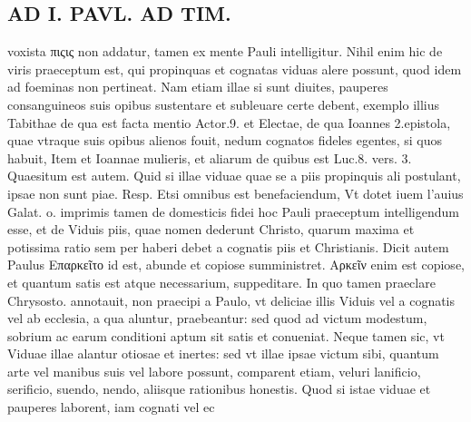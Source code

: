 \documentclass{article}
\begin{document}
\begin{pages}
\section*{AD I. PAVL. AD TIM. }
\marginpar{[ p.302 ]}\pstart voxista πιςις non addatur, tamen ex mente Pauli intelligitur. Nihil enim hic de viris praeceptum est, qui propinquas et cognatas viduas alere possunt, quod idem ad foeminas non pertineat. Nam etiam illae si sunt diuites, pauperes consanguineos suis opibus sustentare et subleuare certe debent, exemplo illius Tabithae de qua est facta mentio Actor.9. et Electae, de qua Ioannes 2.epistola, quae vtraque suis opibus alienos fouit, nedum cognatos fideles egentes, si quos habuit, Item et Ioannae mulieris, et aliarum de quibus est Luc.8. vers. 3. Quaesitum est autem. Quid si illae viduae quae se a piis propinquis ali postulant, ipsae non sunt piae. Resp. Etsi omnibus est benefaciendum, Vt dotet iuem l'auius Galat. o. imprimis tamen de domesticis fidei hoc Pauli praeceptum intelligendum esse, et de Viduis piis, quae nomen dederunt Christo, quarum maxima et potissima ratio sem per haberi debet a cognatis piis et Christianis.  \pend\pstart Dicit autem Paulus Επαρκεῖτο id est, abunde et copiose sumministret. Αρκεῖν enim est copiose, et quantum satis est atque necessarium, suppeditare. In quo tamen praeclare Chrysosto. annotauit, non praecipi a Paulo, vt deliciae illis Viduis vel a cognatis vel ab ecclesia, a qua aluntur, praebeantur: sed quod ad victum modestum, sobrium ac earum conditioni aptum sit satis et conueniat. Neque tamen sic, vt Viduae illae alantur otiosae et inertes: sed vt illae ipsae victum sibi, quantum arte vel manibus suis vel labore possunt, comparent etiam, veluri lanificio, serificio, suendo, nendo, aliisque rationibus honestis. Quod si istae viduae et pauperes laborent, iam cognati vel ec\pend

\end{pages}
\end{document}
